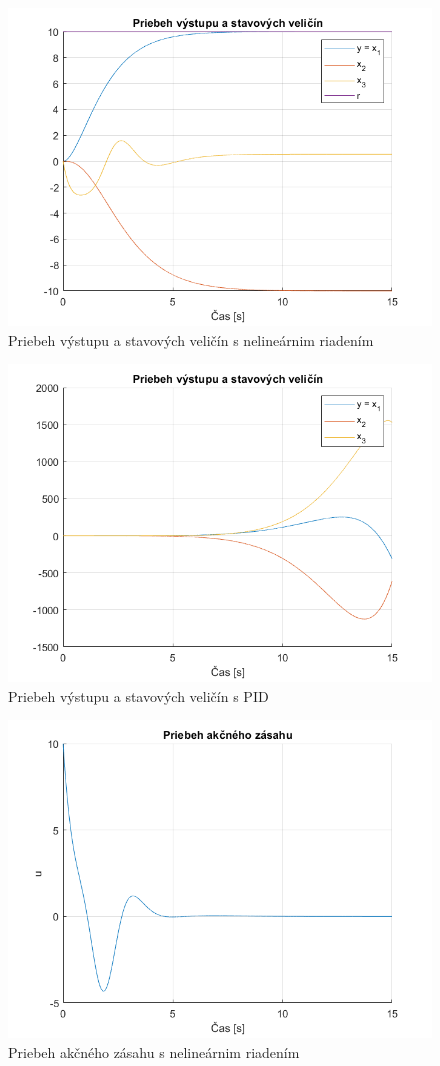 \documentclass[../main.tex]{subfiles}
\begin{document}
	\begin{figure}[h!]
		\centering
		\includegraphics[width=0.8\linewidth]{SimulaciaNelin}
		\caption{Priebeh výstupu a stavových veličín s nelineárnim riadením}
		\label{fig:svlvs2_simulaciaNelin}
	\end{figure}

	\begin{figure}[h!]
		\centering
		\includegraphics[width=0.8\linewidth]{SimulaciaPID}
		\caption{Priebeh výstupu a stavových veličín s PID}
		\label{fig:svlvs2_SimulaciaPID}
	\end{figure}

	\begin{figure}[h!]
		\centering
		\includegraphics[width=0.8\linewidth]{SimulaciaNelinU}
		\caption{Priebeh akčného zásahu s nelineárnim riadením}
		\label{fig:svlvs2_simulaciaNelinU}
	\end{figure}
\end{document}
